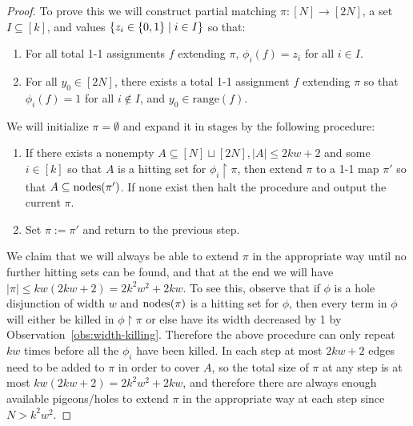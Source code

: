 \begin{proof}
To prove this we will construct partial matching $\pi: [N] \to [2N]$, a set $I \subseteq [k]$, and values $\{z_i \in \{0,1\} \mid i \in I\}$ so that:
\begin{enumerate}
    \item For all total 1-1 assignments $f$ extending $\pi$, $\phi_i(f) = z_i$ for all $i \in I$.
    \item For all $y_0 \in [2N]$, there exists a total 1-1 assignment $f$ extending $\pi$ so that $\phi_i(f)=1$ for all $i \notin I$, and $y_0 \in \mathrm{range}(f)$.
\end{enumerate}
We will initialize $\pi = \emptyset$ and expand it in stages by the following procedure:
\begin{enumerate}
    \item If there exists a nonempty $A \subseteq [N] \sqcup [2N], |A| \leq 2kw + 2$ and some $i\in [k]$ so that $A$ is a hitting set for $\phi_i \upharpoonright \pi$, then extend $\pi$ to a 1-1 map $\pi'$ so that $A \subseteq \mathrm{nodes}(\pi')$. If none exist then halt the procedure and output the current $\pi$.
    \item Set $\pi := \pi'$ and return to the previous step.
\end{enumerate}
We claim that we will always be able to extend $\pi$ in the appropriate way until no further hitting sets can be found, and that at the end we will have $|\pi| \leq kw(2kw+2)=2k^2w^2 +2kw$. To see this, observe that if $\phi$ is a hole disjunction of width $w$ and $\mathrm{nodes}(\pi)$ is a hitting set for $\phi$, then every term in $\phi$ will either be killed in $\phi\upharpoonright\pi$ or else have its width decreased by 1 by Observation~\ref{obs:width-killing}. Therefore the above procedure can only repeat $kw$ times before all the $\phi_i$ have been killed. In each step at most $2kw+2$ edges need to be added to $\pi$ in order to cover $A$, so the total size of $\pi$ at any step is at most $kw(2kw+2)=2k^2w^2 +2kw$, and therefore there are always enough available pigeons/holes to extend $\pi$ in the appropriate way at each step since $N > k^2w^2$.


\end{proof}

